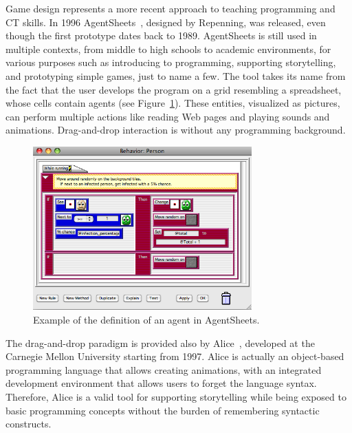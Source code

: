 Game design represents a more recent approach to teaching programming and \ac{CT} skills. In 1996 AgentSheets~\cite{Repenning:2000}, designed by Repenning, was released, even though the first prototype dates back to 1989. AgentSheets is still used in multiple contexts, from middle to high schools to academic environments, for various purposes such as introducing to programming, supporting storytelling, and prototyping simple games, just to name a few. The tool takes its name from the fact that the user develops the program on a grid resembling a spreadsheet, whose cells contain agents (see Figure~\ref{fig:agentsheets}). These entities, visualized as pictures, can perform multiple actions like reading Web pages and playing sounds and animations. Drag-and-drop interaction is  without any programming background.
\begin{figure}[ht!]
  \centering
  \includegraphics[width=0.75\textwidth]{images/c2/AgentSheets.png} 
  \caption{Example of the definition of an agent in AgentSheets.}\label{fig:agentsheets}
\end{figure}

The drag-and-drop paradigm is provided also by Alice~\cite{Herbert:2012}, developed at the Carnegie Mellon University starting from 1997. Alice is actually an object-based programming language that allows creating animations, with an integrated development environment that allows users to forget the language syntax. Therefore, Alice is a valid tool for supporting storytelling while being exposed to basic programming concepts without the burden of remembering syntactic constructs.

